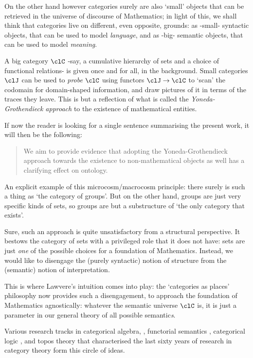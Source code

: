 On the other hand however categories surely are also `small' objects that can be retrieved in the universe of discourse of Mathematics; in light of this, we shall think that categories live on different, even opposite, grounds: as -small- syntactic objects, that can be used to model \emph{language}, and as -big- semantic objects, that can be used to model \emph{meaning}. 

A big category $\clC$ -say, a cumulative hierarchy of sets and a choice of functional relations- is given once and for all, in the background. Small categories $\clJ$ can be used to \emph{probe} $\clC$ using functors $\clJ \to \clC$ to `scan' the codomain for domain-shaped information, and draw pictures of it in terms of the traces they leave. This is but a reflection of what is called the \emph{Yoneda-Grothendieck approach} to the existence of mathematical entities.

If now the reader is looking for a single sentence summarising the present work, it will then be the following:
\begin{quote}
	We aim to provide evidence that adopting the Yoneda-Grothendieck approach towards the existence to non-mathematical objects as well has a clarifying effect on ontology.
\end{quote}
An explicit example of this microcosm\fshyp{}macrocosm principle: there surely is such a thing as `the category of groups'. But on the other hand, groups are just very specific kinds of sets, so groups are but a substructure of `the only category that exists'.

Sure, such an approach is quite unsatisfactory from a structural perspective. It bestows the category of sets with a privileged role that it does not have: sets are just \emph{one} of the possible choices for a foundation of Mathematics. Instead, we would like to disengage the (purely syntactic) notion of structure from the (semantic) notion of interpretation.

This is where Lawvere's intuition comes into play: the `categories as places' philosophy now provides such a disengagement, to approach the foundation of Mathematics agnostically: whatever the semantic universe $\clC$ is, it is just a parameter in our general theory of all possible semantic\emph{s}.

Various research tracks in categorical algebra, \cite{Janelidze2004}, functorial semantics \cite{lawvere1963functorial,hyland2007category}, categorical logic \cite{lambek1988introduction}, and topos theory \cite{JohnstonePT} that characterised the last sixty years of research in category theory form this circle of ideas.


